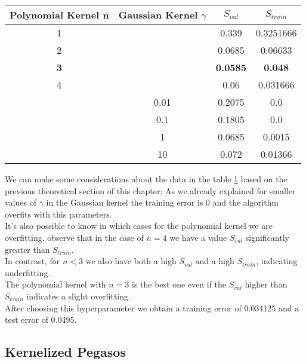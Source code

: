 \begin{table}[]
    \begin{tabular}{|c|c|c|c|}
        \hline
        Polynomial Kernel n & Gaussian Kernel $\gamma$ & $S_{val}$ & $S_{train}$ \\ \hline
        1 & & 0.339 & 0.3251666 \\ \hline
    2 & & 0.0685 & 0.06633 \\ \hline
    \textbf{3} & & \textbf{0.0585} & \textbf{0.048} \\ \hline
    4 & & 0.06 & 0.031666 \\ \hline
    & 0.01 & 0.2075 & 0.0 \\ \hline
    & 0.1 & 0.1805 & 0.0 \\ \hline
    & 1  & 0.0685 & 0.0015 \\ \hline
     & 10 & 0.072 & 0.01366 \\ \hline    
    \end{tabular}
    \label{tab:kper}
\end{table}
We can make some considerations about the data in the table \ref{tab:kper} based on the previous theoretical section of this chapter:
As we already explained for smaller values of $\gamma$ in the Gaussian kernel the training error is 0 and the algorithm overfits with this parameters.\\
It's also possible to know in which cases for the polynomial kernel we are overfitting, observe that in the case of $n = 4$ we have a value $S_{val}$ significantly greater than $S_{train}$.\\
In contrast, for $n < 3$ we also have both a high $S_{val}$ and a high $S_{train}$, indicating underfitting.\\
The polynomial kernel with $n = 3$ is the best one even if the $S_{val}$ higher than $S_{train}$ indicates a slight overfitting.\\
After choosing this hyperparameter we obtain  a training error of 0.034125 and a test error of 0.0495.\\

\subsection{Kernelized Pegasos}

